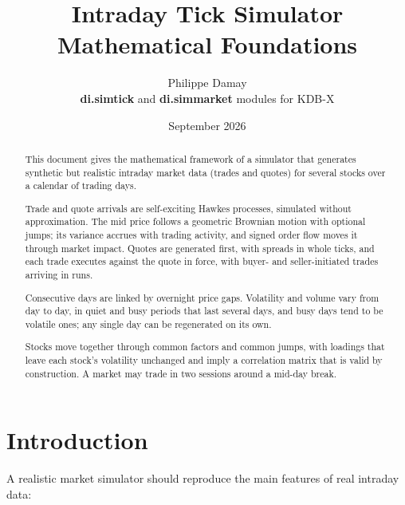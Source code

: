 \documentclass[11pt,a4paper]{article}
\title{\textbf{Intraday Tick Simulator}\\[4pt]\large Mathematical Foundations}
\author{Philippe Damay\\[2pt]
\small \textbf{di.simtick} and \textbf{di.simmarket} modules for KDB-X}
\date{September 2026}
\theoremstyle{paper}
\begin{document}
\maketitle

\begin{abstract}
\noindent This document gives the mathematical framework of a simulator that generates synthetic but realistic intraday market data (trades and quotes) for several stocks over a calendar of trading days.

\medskip
\noindent Trade and quote arrivals are self-exciting Hawkes processes, simulated without approximation. The mid price follows a geometric Brownian motion with optional jumps; its variance accrues with trading activity, and signed order flow moves it through market impact. Quotes are generated first, with spreads in whole ticks, and each trade executes against the quote in force, with buyer- and seller-initiated trades arriving in runs.

\medskip
\noindent Consecutive days are linked by overnight price gaps. Volatility and volume vary from day to day, in quiet and busy periods that last several days, and busy days tend to be volatile ones; any single day can be regenerated on its own.

\medskip
\noindent Stocks move together through common factors and common jumps, with loadings that leave each stock's volatility unchanged and imply a correlation matrix that is valid by construction. A market may trade in two sessions around a mid-day break.
\end{abstract}

\newpage
\tableofcontents
\newpage

\section{Introduction}

A realistic market simulator should reproduce the main features of real intraday data:
\end{document}
